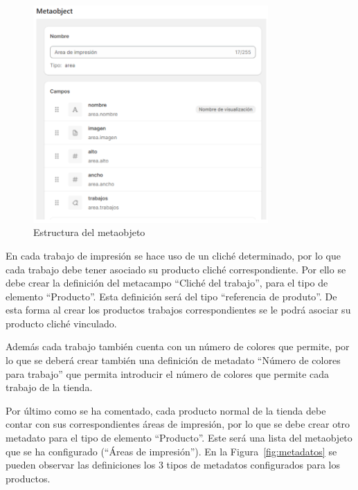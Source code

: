 \documentclass[12pt]{article}
\begin{document}
\begin{figure}[ht]
    \centering
    \includegraphics[width=0.8\textwidth]{imagenesUS2/creacionMetaobjeto.png}
    \caption{\label{fig:metaobjeto}Estructura del metaobjeto}
    \vspace{\fill}
\end{figure}

En cada trabajo de impresión se hace uso de un cliché determinado, por lo que cada trabajo debe tener asociado su producto cliché correspondiente. Por ello se debe 
crear la definición del metacampo ``Cliché del trabajo'', para el tipo de elemento ``Producto''. Esta definición será del tipo ``referencia de produto''. De esta forma al crear los productos trabajos correspondientes se le podrá asociar su producto cliché vinculado.

Además cada trabajo también cuenta con un número de colores que permite, por lo que se deberá crear también una definición de metadato ``Número de colores para trabajo'' que permita
introducir el número de colores que permite cada trabajo de la tienda.

Por último como se ha comentado, cada producto normal de la tienda debe contar con sus correspondientes áreas de impresión, por lo que se debe crear otro metadato para el tipo de elemento ``Producto''. Este será una 
lista del metaobjeto que se ha configurado (``Áreas de impresión''). En la Figura~\ref{fig:metadatos} se pueden observar las definiciones los 3 tipos de metadatos configurados para los productos.
\end{document}
